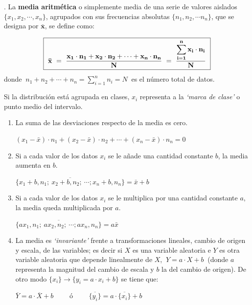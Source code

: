 \vspace{5mm}%
\begin{definition}
	. La \textbf{media aritmética} o simplemente media de una serie de valores aislados $\{x_1,x_2,\cdots , x_n\}$,  agrupados con sus frecuencias absolutas $\{n_1, n_2,\cdots n_n\}$, que se designa por $\boldsymbol{\bar{x}}$, se define como:

	
	$$\boxed{ \ \bold{ \bar{x}\ =\ \dfrac{x_1\cdot n_1+x_2\cdot n_2+\cdots +x_n \cdot n_n}{N}\ =\ \dfrac { \displaystyle \sum_{i=1}^n x_i\cdot n_i}{N} } \ }$$
donde $\ n_1+n_2+\cdots + n_n=\displaystyle \sum_{i=1}^n n_i=N \ $	 es el número total de datos.

\vspace{2mm} Si la distribución está agrupada en clases, $x_i$ representa a la \emph{`marca de clase'} o punto medio del intervalo.
\end{definition}

\vspace{5mm}%
\begin{theorem}
	
	  \begin{enumerate}
 		\item La suma de las desviaciones respecto de la media es cero.
 		
 		$(x_1-\bar{x})\cdot n_1+ (x_2-\bar{x})\cdot n_2+\cdots +(x_n-\bar{x})\cdot n_n=0$
 		\item Si a cada valor de los datos $x_i$ se le añade una cantidad constante $b$, la media aumenta en $b$.
 		
 		$ \overline{ \{x_1+b, n_1;\ x_2+b,n_2; \ \cdots ; x_n+b, n_n \} } =\bar{x}+b$
 		\item Si a cada valor de los datos $x_i$ se le multiplica por una cantidad constante $a$, la media queda multiplicada por  $a$.
 		
 		$ \overline{ \{ax_1, n_1;\ ax_2,n_2; \ \cdots ; ax_n, n_n \} } =a\bar{x}$
 		
 		\item 	La media es \emph{`invariante'} frente a transformaciones lineales, cambio de origen y escala, de las variables; es decir si $X$ es una variable aleatoria e $Y$ es otra variable aleatoria que depende linealmente de $X$,  $\  Y = a\cdot X + b \ $ (donde $a$ representa la magnitud del cambio de escala y $b$ la del cambio de origen). De otro modo $\{x_i\}\to \{y_i=a\cdot x_i+b\}$ se tiene que:
 		
 		$\overline Y = a \cdot \overline X + b \qquad \text{ ó } \qquad \overline {\{y_i\}} = a \cdot \overline {\{x_i\}} + b$
 		
 		\end{enumerate}	
\end{theorem}

